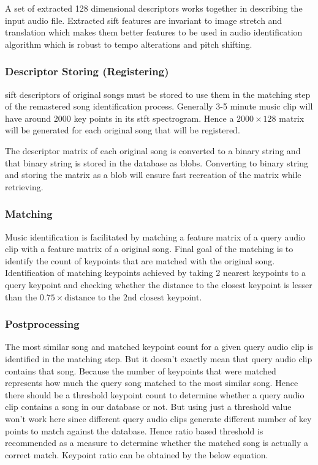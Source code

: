 A set of extracted 128 dimensional descriptors works together in describing the input audio file. Extracted 
\ac{sift} features are invariant to image stretch and translation which makes them better features to be used
in audio identification algorithm which is robust to tempo alterations and pitch shifting. 

\subsubsection{Descriptor Storing (Registering)}
\ac{sift} descriptors of original songs must be stored to use them in the matching step of the remastered
song identification process. Generally 3-5 minute music clip will have around 2000 key points in its \ac{stft}
spectrogram. Hence a \(2000\times 128\) matrix will be generated for each original song that will be registered.

The descriptor matrix of each original song is converted to a binary string and that binary string is stored 
in the database as \ac{blob}s. Converting to binary string and storing the matrix as a \ac{blob} will ensure
fast recreation of the matrix while retrieving\cite{Sears2006}.   

\subsubsection{Matching}
Music identification is facilitated by matching a feature matrix of a query audio clip with a feature matrix of a original song. Final goal
of the matching is to identify the count of keypoints that are matched with the original song. Identification of matching keypoints achieved
by taking 2 nearest keypoints to a query keypoint and checking whether the distance to the closest keypoint is lesser than 
the \(0.75 \times \text{distance to the 2nd closest keypoint}\).

\subsubsection{Postprocessing}
The most similar song and matched keypoint count for a given query audio clip is identified in the matching step. But
it doesn't exactly mean that query audio clip contains that song. Because the number of keypoints that were matched
represents how much the query song matched to the most similar song. Hence there should be a threshold keypoint count
to determine whether a query audio clip contains a song in our database or not. But using just a threshold value 
won't work here since different query audio clips generate different number of key points to match against the
database. Hence ratio based threshold is recommended as a measure to determine whether the matched song is actually a
correct match. Keypoint ratio can be obtained by the below equation. 

